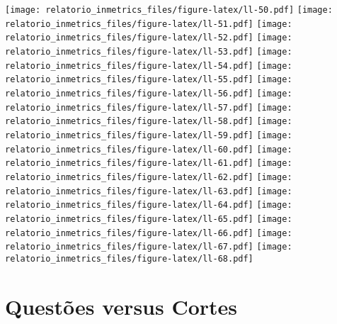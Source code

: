 \documentclass[]{book}
\begin{document}
\texttt{[image: relatorio\_inmetrics\_files/figure-latex/ll-50.pdf]} \texttt{[image: relatorio\_inmetrics\_files/figure-latex/ll-51.pdf]} \texttt{[image: relatorio\_inmetrics\_files/figure-latex/ll-52.pdf]} \texttt{[image: relatorio\_inmetrics\_files/figure-latex/ll-53.pdf]} \texttt{[image: relatorio\_inmetrics\_files/figure-latex/ll-54.pdf]} \texttt{[image: relatorio\_inmetrics\_files/figure-latex/ll-55.pdf]} \texttt{[image: relatorio\_inmetrics\_files/figure-latex/ll-56.pdf]} \texttt{[image: relatorio\_inmetrics\_files/figure-latex/ll-57.pdf]} \texttt{[image: relatorio\_inmetrics\_files/figure-latex/ll-58.pdf]} \texttt{[image: relatorio\_inmetrics\_files/figure-latex/ll-59.pdf]} \texttt{[image: relatorio\_inmetrics\_files/figure-latex/ll-60.pdf]} \texttt{[image: relatorio\_inmetrics\_files/figure-latex/ll-61.pdf]} \texttt{[image: relatorio\_inmetrics\_files/figure-latex/ll-62.pdf]} \texttt{[image: relatorio\_inmetrics\_files/figure-latex/ll-63.pdf]} \texttt{[image: relatorio\_inmetrics\_files/figure-latex/ll-64.pdf]} \texttt{[image: relatorio\_inmetrics\_files/figure-latex/ll-65.pdf]} \texttt{[image: relatorio\_inmetrics\_files/figure-latex/ll-66.pdf]} \texttt{[image: relatorio\_inmetrics\_files/figure-latex/ll-67.pdf]} \texttt{[image: relatorio\_inmetrics\_files/figure-latex/ll-68.pdf]}

\hypertarget{questoes-versus-cortes}{%
\chapter{Questões versus Cortes}\label{questoes-versus-cortes}}

\begingroup\fontsize{7}{9}\selectfont
\end{document}
